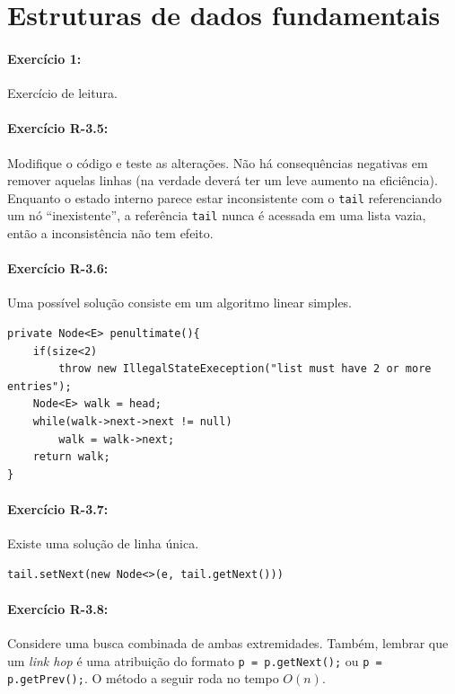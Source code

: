 \section{Estruturas de dados fundamentais}

\paragraph{Exercício 1:}
Exercício de leitura.

\paragraph{Exercício R-3.5:}
Modifique o código e teste as alterações. Não há consequências negativas em remover aquelas linhas (na verdade deverá ter um leve aumento na eficiência). Enquanto o estado interno parece estar inconsistente com o \texttt{tail} referenciando um nó ``inexistente'', a referência \texttt{tail} nunca é acessada em uma lista vazia, então a inconsistência não tem efeito.

\paragraph{Exercício R-3.6:}
Uma possível solução consiste em um algoritmo linear simples.

\begin{lstlisting}[frame=single]
private Node<E> penultimate(){
	if(size<2)
		throw new IllegalStateExeception("list must have 2 or more entries");
	Node<E> walk = head;
	while(walk->next->next != null)
		walk = walk->next;
	return walk;
}
\end{lstlisting}

\paragraph{Exercício R-3.7:}
Existe uma solução de linha única.

\begin{lstlisting}[frame=single]
tail.setNext(new Node<>(e, tail.getNext()))
\end{lstlisting}

\paragraph{Exercício R-3.8:}
Considere uma busca combinada de ambas extremidades. Também, lembrar que um \textit{link hop} é uma atribuição do formato \texttt{p = p.getNext();} ou \texttt{p = p.getPrev();}. O método a seguir roda no tempo $O(n)$.

